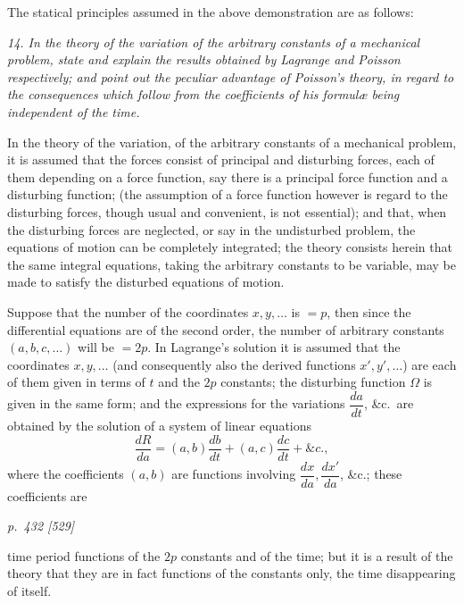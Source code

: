 \documentclass[11pt,a4paper]{article}
\theoremstyle{plain}
\theoremstyle{definition}
\begin{document}
The statical principles assumed in the above demonstration are as follows:

\textit{14. In the theory of the variation of the arbitrary constants of a mechanical problem,
state and explain the results obtained by Lagrange and Poisson respectively; and point
out the peculiar advantage of Poisson's theory, in regard to the consequences which follow
from the coefficients of his formul\ae{} being independent of the time.}

In the theory of the variation, of the arbitrary constants of a mechanical problem,
it is assumed that the forces consist of principal and disturbing forces, each of them
depending on a force function, say there is a principal force function and a disturbing
function; (the assumption of a force function however is regard to the disturbing
forces, though usual and convenient, is not essential); and that, when the disturbing
forces are neglected, or say in the undisturbed problem, the equations of motion can
be completely integrated; the theory consists herein that the same integral equations,
taking the arbitrary constants to be variable, may be made to satisfy the disturbed
equations of motion.

Suppose that the number of the coordinates $x, y, \ldots$ is $= p$, then since the differential
equations are of the second order, the number of arbitrary constants $(a, b, c, \ldots)$ will
be $= 2p$. In Lagrange's solution it is assumed that the coordinates $x, y, \ldots$ (and consequently also the derived functions $x', y', \ldots$) are each of them given in terms of $t$
and the $2p$ constants; the disturbing function $\Omega$ is given in the same form; and
the expressions for the variations $\dfrac{da}{dt}$, \&c.\ are obtained by the solution of a system of linear
equations
\[
\frac{dR}{da} = (a, b)\frac{db}{dt} + (a, c)\frac{dc}{dt} + \&c.,
\]
where the coefficients $(a, b)$ are functions involving $\dfrac{dx}{da}, \dfrac{dx'}{da}$, \&c.; these coefficients are

\clearpage

\bigskip
\textit{p.~432 [529]}
\smallskip

\noindent
time period functions of the $2p$ constants and of the time; but it is a result
of the theory that they are in fact functions of the constants only, the time disappearing of itself.
\end{document}
